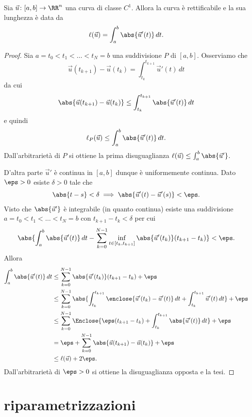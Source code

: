 \begin{theorem}
    Sia $\vec u \colon [a,b] \to \RR^n$ una curva di classe $C^1$.
    Allora la curva è rettificabile e la sua lunghezza è data da
    \[
      \ell(\vec u) = \int_a^b \abs{\vec u'(t)} \, dt.
    \]
\end{theorem}
\begin{proof}
Sia $a = t_0 < t_1 < \dots < t_N = b$ una suddivisione $P$ di $[a,b]$.
Osserviamo che 
\[
  \vec u(t_{k+1}) - \vec u(t_k) = \int_{t_k}^{t_{k+1}} \vec u'(t) \, dt
\]
da cui 
\[
 \abs{\vec u(t_{k+1})-\vec u(t_k)} \le \int_{t_k}^{t_{k+1}} \abs{\vec u'(t)} \, dt
\]
e quindi 
\[
  \ell_P(\vec u) \le \int_a^b \abs{\vec u'(t)} \, dt.
\]
Dall'arbitrarietà di $P$ si ottiene la prima disuguaglianza 
$\ell(\vec u) \le \int_a^b \abs{\vec u'}$.

D'altra parte $\vec u'$ è continua in $[a,b]$ dunque è uniformemente continua.
Dato $\eps>0$ esiste $\delta>0$ tale che
\[
  \abs{t-s} < \delta \implies \abs{\vec u'(t) - \vec u'(s)} < \eps.
\]
Visto che $\abs{\vec u'}$ è integrabile (in quanto continua) esiste una suddivisione
$a = t_0 < t_1 < \dots < t_N = b$ con $t_{k+1}-t_k < \delta$ per cui
\[
  \abs{\int_a^b \abs{\vec u'(t)} \, dt - \sum_{k=0}^{N-1} \inf_{t\in [t_k, t_{k+1}]} \abs{\vec u'(t_k)} (t_{k+1}-t_k)} 
  < \eps.
\]
Allora 
\begin{align*}
  \int_a^b \abs{\vec u'(t)} \, dt
    &\le \sum_{k=0}^{N-1} \abs{\vec u'(t_k)} (t_{k+1}-t_k) + \eps \\
    &\le \sum_{k=0}^{N-1} \abs{ \int_{t_k}^{t_{k+1}} \enclose{\vec u'(t_k) - \vec u'(t)} \, dt + \int_{t_k}^{t_{k+1}}\vec u'(t)\, dt} + \eps \\
    &\le \sum_{k=0}^{N-1} \Enclose{ \eps (t_{k+1}-t_k) + \int_{t_k}^{t_{k+1}} \abs{\vec u'(t)} \, dt} + \eps \\
    &=  \eps + \sum_{k=0}^{N-1}  \abs{\vec u(t_{k+1}) - \vec u(t_k)} + \eps \\
    &\le \ell(\vec u) + 2\eps.
\end{align*}
Dall'arbitrarietà di $\eps>0$ si ottiene la disuguaglianza opposta e la tesi.
\end{proof}

\section{riparametrizzazioni}

